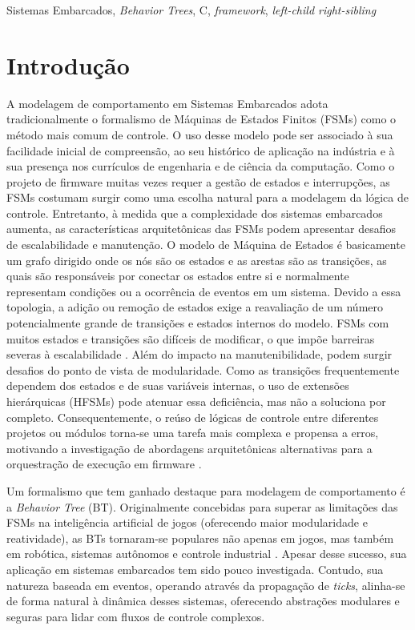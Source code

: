 \documentclass[conference]{IEEEtran}
\begin{document}
\begin{IEEEkeywords}
Sistemas Embarcados, \textit{Behavior Trees}, C, \textit{framework}, \textit{left-child right-sibling}
\end{IEEEkeywords}

\section{Introdução}

A modelagem de comportamento em Sistemas Embarcados adota tradicionalmente o formalismo de Máquinas de Estados Finitos (FSMs) como o método mais comum de controle. O uso desse modelo pode ser associado à sua facilidade inicial de compreensão, ao seu histórico de aplicação na indústria e à sua presença nos currículos de engenharia e de ciência da computação. Como o projeto de firmware muitas vezes requer a gestão de estados e interrupções, as FSMs costumam surgir como uma escolha natural para a modelagem da lógica de controle. Entretanto, à medida que a complexidade dos sistemas embarcados aumenta, as características arquitetônicas das FSMs podem apresentar desafios de escalabilidade e manutenção. O modelo de Máquina de Estados é basicamente um grafo dirigido onde os nós são os estados e as arestas são as transições, as quais são responsáveis por conectar os estados entre si e normalmente representam condições ou a ocorrência de eventos em um sistema. Devido a essa topologia, a adição ou remoção de estados exige a reavaliação de um número potencialmente grande de transições e estados internos do modelo. FSMs com muitos estados e transições são difíceis de modificar, o que impõe barreiras severas à escalabilidade \cite{biggar_expressiveness_2021}.  
Além do impacto na manutenibilidade, podem surgir desafios do ponto de vista de modularidade. Como as transições frequentemente dependem dos estados e de suas variáveis internas, o uso de extensões hierárquicas (HFSMs) pode atenuar essa deficiência, mas não a soluciona por completo. Consequentemente, o reúso de lógicas de controle entre diferentes projetos ou módulos torna-se uma tarefa mais complexa e propensa a erros, motivando a investigação de abordagens arquitetônicas alternativas para a orquestração de execução em firmware \cite{iovino_comparison_2025}.

Um formalismo que tem ganhado destaque para modelagem de comportamento é a \textit{Behavior Tree} (BT). Originalmente concebidas para superar as limitações das FSMs na inteligência artificial de jogos (oferecendo maior modularidade e reatividade), as BTs tornaram-se populares não apenas em jogos, mas também em robótica, sistemas autônomos e controle industrial \cite{sidorenko_towards_2024}. Apesar desse sucesso, sua aplicação em sistemas embarcados tem sido pouco investigada. Contudo, sua natureza baseada em eventos, operando através da propagação de \textit{ticks}, alinha-se de forma natural à dinâmica desses sistemas, oferecendo abstrações modulares e seguras para lidar com fluxos de controle complexos.
\end{document}
